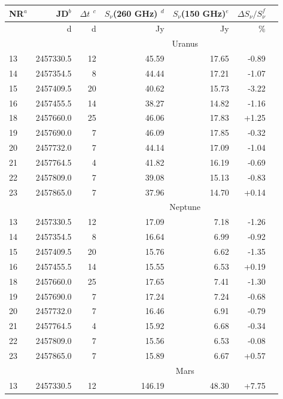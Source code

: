 \begin{table}
\centering
\begin{tabular}{|l|r|r|r|r|r|r|}
\hline
NR$^{a}$  & JD$^{b}$ & $\Delta t$ $^{c}$ & $S_{\nu}$(260 GHz)  $^{d}$& $S_{\nu}$(150  GHz)$^{e}$  & $\Delta S_{\nu}/  S_{\nu} ^{f}$  \\
\hline
         & d  &  d        & Jy               & Jy                 &                                                                    \%  \\
\hline
         &    &            & \multicolumn{3}{|c|}{Uranus}\\
\hline
13 & 2457330.5 &  12 & 45.59 & 17.65 & -0.89\\
14 & 2457354.5 &  8 & 44.44 & 17.21 & -1.07\\
15 & 2457409.5 &  20 & 40.62 & 15.73 & -3.22\\
16 & 2457455.5 &  14 & 38.27 & 14.82 & -1.16\\
18 & 2457660.0 &  25 & 46.06 & 17.83 & +1.25\\
19 & 2457690.0 &  7 & 46.09 & 17.85 & -0.32\\
20 & 2457732.0 &  7 & 44.14 & 17.09 & -1.04\\
21 & 2457764.5 &  4 & 41.82 & 16.19 & -0.69\\
22 & 2457809.0 &  7 & 39.08 & 15.13 & -0.83\\
23 & 2457865.0 &  7 & 37.96 & 14.70 & +0.14\\
\hline
         &    &            & \multicolumn{3}{|c|}{Neptune}\\
\hline
13 & 2457330.5 &  12 & 17.09 & 7.18 & -1.26\\
14 & 2457354.5 &  8 & 16.64 & 6.99 & -0.92\\
15 & 2457409.5 &  20 & 15.76 & 6.62 & -1.35\\
16 & 2457455.5 &  14 & 15.55 & 6.53 & +0.19\\
18 & 2457660.0 &  25 & 17.65 & 7.41 & -1.30\\
19 & 2457690.0 &  7 & 17.24 & 7.24 & -0.68\\
20 & 2457732.0 &  7 & 16.46 & 6.91 & -0.79\\
21 & 2457764.5 &  4 & 15.92 & 6.68 & -0.34\\
22 & 2457809.0 &  7 & 15.56 & 6.53 & -0.08\\
23 & 2457865.0 &  7 & 15.89 & 6.67 & +0.57\\
\hline
         &    &            & \multicolumn{3}{|c|}{Mars}\\
\hline
13 & 2457330.5 &  12 & 146.19 & 48.30 & +7.75\\

\end{tabular}
\end{table}
